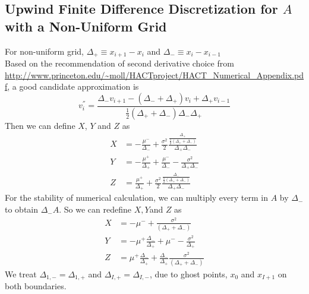 \documentclass[11pt]{etk-article}
\begin{document}
\subsection{Upwind Finite Difference Discretization for $A$ with a Non-Uniform Grid}
For non-uniform grid, $\Delta_{+} \equiv x_{i+1} - x_{i}$ and $\Delta_{-} \equiv x_{i} - x_{i-1}$\\
Based on the recommendation of second derivative choice from \url{http://www.princeton.edu/~moll/HACTproject/HACT_Numerical_Appendix.pdf}, a good candidate approximation is
\begin{equation}
v_i^{''} = \frac{\Delta_{-}v_{i+1} - (\Delta_{-}+\Delta_{+})v_i+\Delta_{+}v_{i-1}}{\frac{1}{2}(\Delta_{+}+\Delta_{-})\Delta_{-}\Delta_{+}} \label{eq:v''}
\end{equation}
Then we can define $X$, $Y$ and $Z$ as 
\begin{align}
X &= -\frac{\mu^{-}}{\Delta_{-}} + \frac{\sigma^2}{2}\frac{\frac{\Delta_{+}}{\frac{1}{2}(\Delta_{+}+\Delta_{-})}}{\Delta_{+}\Delta_{-}}\\
Y &= -\frac{\mu^{+}}{\Delta_{+}}+\frac{\mu^{-}}{\Delta_{-}} -\frac{\sigma^2}{\Delta_{+}\Delta_{-}}\\
Z &= \frac{\mu^{+}}{\Delta_{+}} + \frac{\sigma^2}{2}\frac{\frac{\Delta_{-}}{\frac{1}{2}(\Delta_{+}+\Delta_{-})}}{\Delta_{+}\Delta_{-}}
\end{align}
For the stability of numerical calculation, we can multiply every term in $A$ by $\Delta_{-}$ to obtain $\Delta_{-}A$. So we can redefine $X, Y $and $Z$ as 
\begin{align}
X &= -\mu^{-} + \frac{\sigma^2}{(\Delta_{+}+\Delta_{-})} \label{eq:X-non-uniform}\\
Y &= -\mu^{+}\frac{\Delta_{-}}{\Delta_{+}}+\mu^{-} -\frac{\sigma^2}{\Delta_{+}} \label{eq:Y-non-uniform}\\
Z &=\mu^{+}\frac{\Delta_{-}}{\Delta_{+}} + \frac{\Delta_{-}}{\Delta_{+}}\frac{\sigma^2}{(\Delta_{+}+\Delta_{-})} \label{eq:Z-non-uniform}
\end{align}
We treat $\Delta_{1, -} = \Delta_{1, +}$ and $\Delta_{I, +} = \Delta_{I, -}$, due to ghost points, $x_0$ and $x_{I+1}$ on both boundaries.  \\
\end{document}
